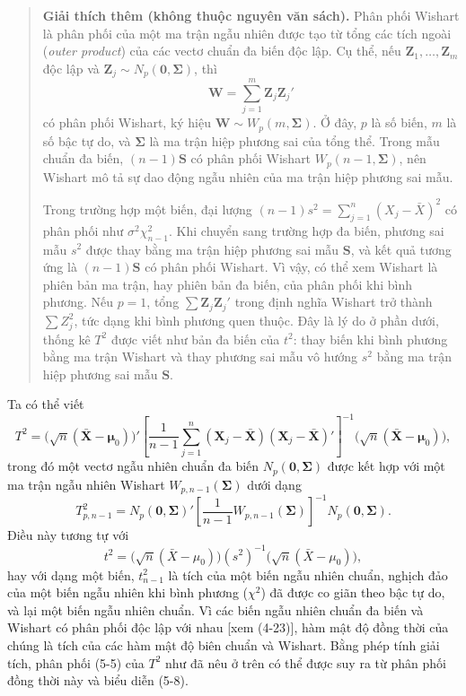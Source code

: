 \begin{quote}
\small
\textbf{Giải thích thêm (không thuộc nguyên văn sách).} Phân phối Wishart là
phân phối của một ma trận ngẫu nhiên được tạo từ tổng các tích ngoài
(\textit{outer product}) của các vectơ chuẩn đa biến độc lập. Cụ thể, nếu
\(\mathbf{Z}_1,\ldots,\mathbf{Z}_m\) độc lập và
\(\mathbf{Z}_j\sim N_p(\mathbf{0},\boldsymbol{\Sigma})\), thì
\[
  \mathbf{W}=\sum_{j=1}^{m}\mathbf{Z}_j\mathbf{Z}_j'
\]
có phân phối Wishart, ký hiệu
\(\mathbf{W}\sim W_p(m,\boldsymbol{\Sigma})\). Ở đây, \(p\) là số biến,
\(m\) là số bậc tự do, và \(\boldsymbol{\Sigma}\) là ma trận hiệp phương sai
của tổng thể. Trong mẫu chuẩn đa biến, \((n-1)\mathbf{S}\) có phân phối
Wishart \(W_p(n-1,\boldsymbol{\Sigma})\), nên Wishart mô tả sự dao động
ngẫu nhiên của ma trận hiệp phương sai mẫu.

Trong trường hợp một biến, đại lượng
\((n-1)s^2=\sum_{j=1}^{n}(X_j-\bar{X})^2\) có phân phối như
\(\sigma^2\chi^2_{n-1}\). Khi chuyển sang trường hợp đa biến, phương sai mẫu
\(s^2\) được thay bằng ma trận hiệp phương sai mẫu \(\mathbf{S}\), và kết quả
tương ứng là \((n-1)\mathbf{S}\) có phân phối Wishart. Vì vậy, có thể xem
Wishart là phiên bản ma trận, hay phiên bản đa biến, của phân phối khi
bình phương. Nếu \(p=1\), tổng \(\sum \mathbf{Z}_j\mathbf{Z}_j'\) trong định nghĩa
Wishart trở thành \(\sum Z_j^2\), tức dạng khi bình phương quen thuộc. Đây là lý
do ở phần dưới, thống kê \(T^2\) được viết như bản đa biến của \(t^2\): thay
biến khi bình phương bằng ma trận Wishart và thay phương sai mẫu vô hướng
\(s^2\) bằng ma trận hiệp phương sai mẫu \(\mathbf{S}\).
\end{quote}

Ta có thể viết
\[
  T^2
  = \bigl(\sqrt{n}(\bar{\mathbf{X}}-\boldsymbol{\mu}_0)\bigr)'
  \left[
    \frac{1}{n-1}\sum_{j=1}^{n}
    (\mathbf{X}_j-\bar{\mathbf{X}})(\mathbf{X}_j-\bar{\mathbf{X}})'
  \right]^{-1}
  \bigl(\sqrt{n}(\bar{\mathbf{X}}-\boldsymbol{\mu}_0)\bigr),
\]
trong đó một vectơ ngẫu nhiên chuẩn đa biến \(N_p(\mathbf{0},\boldsymbol{\Sigma})\)
được kết hợp với một ma trận ngẫu nhiên Wishart
\(W_{p,n-1}(\boldsymbol{\Sigma})\) dưới dạng
\begin{equation}
  T^2_{p,n-1}
  = N_p(\mathbf{0},\boldsymbol{\Sigma})'
    \left[\frac{1}{n-1}W_{p,n-1}(\boldsymbol{\Sigma})\right]^{-1}
    N_p(\mathbf{0},\boldsymbol{\Sigma}).
\end{equation}
Điều này tương tự với
\[
  t^2 = \bigl(\sqrt{n}(\bar{X}-\mu_0)\bigr)(s^2)^{-1}
        \bigl(\sqrt{n}(\bar{X}-\mu_0)\bigr),
\]
hay với dạng một biến, \(t^2_{n-1}\) là tích của một biến ngẫu nhiên chuẩn, nghịch đảo của một biến ngẫu nhiên khi bình phương (\(\chi^2\)) đã được co giãn theo bậc tự do, và lại một biến ngẫu nhiên chuẩn.
Vì các biến ngẫu nhiên chuẩn đa biến và Wishart có phân phối độc lập với nhau
[xem (4-23)], hàm mật độ đồng thời của chúng là tích của các hàm mật độ biên chuẩn
và Wishart. Bằng phép tính giải tích, phân phối (5-5) của \(T^2\) như đã nêu ở trên
có thể được suy ra từ phân phối đồng thời này và biểu diễn (5-8).

